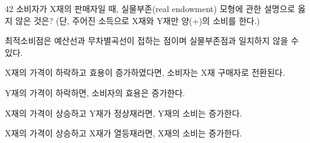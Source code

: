 \begin{question}{42}
소비자가 X재의 판매자일 때, 실물부존(real endowment) 모형에 관한 설명으로 옳지 않은 것은? (단, 주어진 소득으로 X재와 Y재만 양(+)의 소비를 한다.)
\begin{choices}
  \item 최적소비점은 예산선과 무차별곡선이 접하는 점이며 실물부존점과 일치하지 않을 수 있다.
  \item X재의 가격이 하락하고 효용이 증가하였다면, 소비자는 X재 구매자로 전환된다.
  \item Y재의 가격이 하락하면, 소비자의 효용은 증가한다.
  \item X재의 가격이 상승하고 Y재가 정상재라면, Y재의 소비는 증가한다.
  \item X재의 가격이 상승하고 X재가 열등재라면, X재의 소비는 증가한다.
\end{choices}
\end{question}
